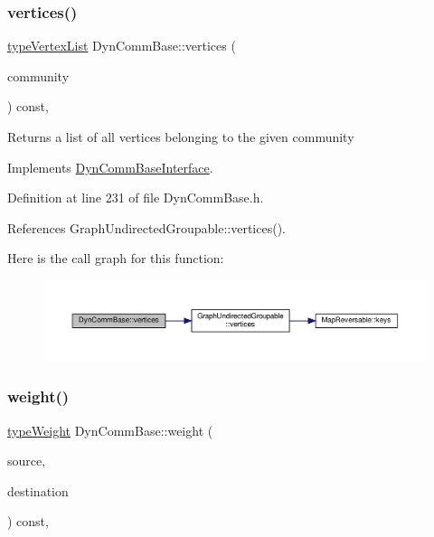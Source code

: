 \subsubsection{\texorpdfstring{vertices()}{vertices()}\hspace{0.1cm}{\footnotesize\ttfamily [2/2]}}
{\footnotesize\ttfamily \hyperlink{graphInterface_8h_a21d54d8a139def524d3b0d6f71ec4974}{type\+Vertex\+List} Dyn\+Comm\+Base\+::vertices (\begin{DoxyParamCaption}\item[{\hyperlink{graphUndirectedGroupable_8h_a914da95c9ea7f14f4b7f875c36818556}{type\+Community}}]{community }\end{DoxyParamCaption}) const\hspace{0.3cm}{\ttfamily [inline]}, {\ttfamily [virtual]}}

\begin{DoxyReturn}{Returns}
a list of all vertices belonging to the given community 
\end{DoxyReturn}


Implements \hyperlink{classDynCommBaseInterface_ab178106e07cf3ad86ce2deb17dd5666e}{Dyn\+Comm\+Base\+Interface}.



Definition at line 231 of file Dyn\+Comm\+Base.\+h.



References Graph\+Undirected\+Groupable\+::vertices().

Here is the call graph for this function\+:
\nopagebreak
\begin{figure}[H]
\begin{center}
\leavevmode
\includegraphics[width=350pt]{classDynCommBase_ae56cd1fc5a69fcd4d0e0a073f3f2e36b_cgraph}
\end{center}
\end{figure}
\mbox{\label{classDynCommBase_ae48a572da3c7b375429e96e717b15787}} 
\subsubsection{\texorpdfstring{weight()}{weight()}}
{\footnotesize\ttfamily \hyperlink{edge_8h_a2e7ea3be891ac8b52f749ec73fee6dd2}{type\+Weight} Dyn\+Comm\+Base\+::weight (\begin{DoxyParamCaption}\item[{const \hyperlink{edge_8h_a5fbd20c46956d479cb10afc9855223f6}{type\+Vertex} \&}]{source,  }\item[{const \hyperlink{edge_8h_a5fbd20c46956d479cb10afc9855223f6}{type\+Vertex} \&}]{destination }\end{DoxyParamCaption}) const\hspace{0.3cm}{\ttfamily [inline]}, {\ttfamily [virtual]}}

